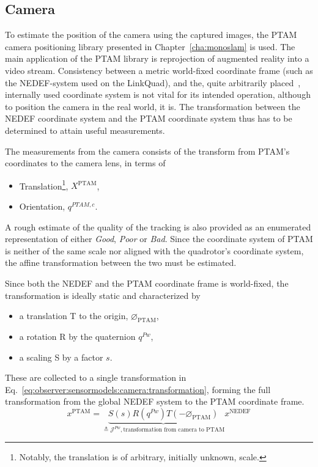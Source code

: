 \subsection{Camera}
\label{ssec:observer:sensormodels:camera}
    To estimate the position of the camera using the captured images,
    the PTAM camera positioning library presented in Chapter~\ref{cha:monoslam} is used.
    The main application of the PTAM library is reprojection of
    augmented reality into a video stream.
    Consistency between a metric world-fixed coordinate frame
    (such as the NEDEF-system used on the LinkQuad), and the, quite arbitrarily placed~\citep{klein07parallel},
    internally used coordinate system is not vital for its intended operation,
    although to position the camera in the real world, it is.
    The transformation between the NEDEF coordinate system and the
    PTAM coordinate system thus has to be determined to attain useful measurements.

    The measurements from the camera consists of the transform from PTAM's coordinates
    to the camera lens, in terms of
    \begin{itemize}
        \item Translation\footnote{Notably, the translation is of arbitrary, initially unknown, scale.}, $X^{\text{PTAM}}$,
        \item Orientation, $q^{PTAM,c}$.
    \end{itemize}
    A rough estimate of the quality of the tracking is also provided as an enumerated representation of either \textit{Good}, \textit{Poor} or \textit{Bad}.
    Since the coordinate system of PTAM is neither of the same scale nor aligned with the quadrotor's coordinate system,
    the affine transformation between the two must be estimated.

    Since both the NEDEF and the PTAM coordinate frame is world-fixed,
    the transformation is ideally static and characterized by
    \begin{itemize}
        \item a translation T to the origin, $\varnothing_{\text{PTAM}}$,
        \item a rotation R by the quaternion $q^{Pw}$,
        \item a scaling S by a factor $s$.
    \end{itemize}
    These are collected to a single transformation in Eq.~\eqref{eq:observer:sensormodels:camera:transformation},
    forming the full transformation from the global NEDEF system to the
    PTAM coordinate frame.
    \begin{equation}
        \label{eq:observer:sensormodels:camera:transformation}
        x^{\text{PTAM}} = \underbrace{S(s) R(q^{Pw}) T(-\varnothing_{\text{PTAM}})}_{\triangleq \mathcal{J}^{Pw}, \text{transformation from camera to PTAM}}
         x^{\text{NEDEF}}
    \end{equation}


